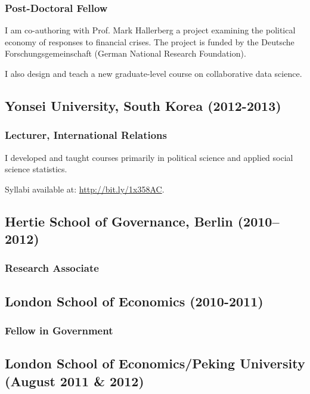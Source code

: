 \documentclass[a4paper]{article}
\begin{document}
{\subsubsection*{Post-Doctoral Fellow}

I am co-authoring with Prof. Mark Hallerberg a project examining the political economy of responses to financial crises. The project is funded by the Deutsche Forschungsgemeinschaft (German National Research Foundation).\vspace{0.25cm}

\noindent I also design and teach a new graduate-level course on collaborative data science.

\subsection*{Yonsei University, South Korea (2012-2013)}
{\subsubsection*{Lecturer, International Relations}

I developed and taught courses primarily in political science and applied social science statistics.
\vspace{0.25cm}

\noindent Syllabi available at: \url{http://bit.ly/1x358AC}.

\subsection*{Hertie School of Governance, Berlin (2010--2012)}
\subsubsection*{Research Associate}

\subsection*{London School of Economics (2010-2011)}
\subsubsection*{Fellow in Government}

\subsection*{London School of Economics/Peking University (August 2011 \& 2012)}
}}
\end{document}
